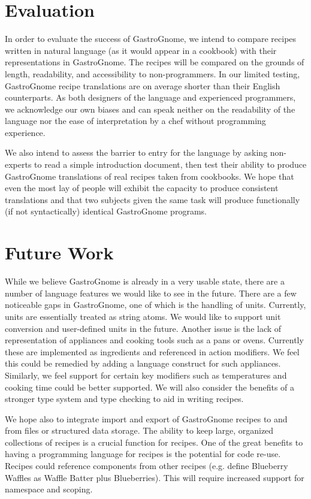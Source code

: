 \documentclass[pldi]{sigplanconf-pldi15}
\begin{document}
\section{Evaluation}
In order to evaluate the success of GastroGnome, we intend to compare recipes
written in natural language (as it would appear in a cookbook) with their
representations in GastroGnome. The recipes will be compared on the grounds of
length, readability, and accessibility to non-programmers. In our limited
testing, GastroGnome recipe translations are on average shorter than their
English counterparts. As both designers of the language and experienced
programmers, we acknowledge our own biases and can speak neither on the
readability of the language nor the ease of interpretation by a chef without
programming experience.

We also intend to assess the barrier to entry for the language by asking
non-experts to read a simple introduction document, then test their ability to
produce GastroGnome translations of real recipes taken from cookbooks. We hope
that even the most lay of people will exhibit the capacity to produce
consistent translations and that two subjects given the same task will produce
functionally (if not syntactically) identical GastroGnome programs.

\section{Future Work}
While we believe GastroGnome is already in a very usable state, there are a
number of language features we would like to see in the future. There are a
few noticeable gaps in GastroGnome, one of which is the handling of units.
Currently, units are essentially treated as string atoms. We would like to
support unit conversion and user-defined units in the future. Another issue is
the lack of representation of appliances and cooking tools such as a pans or
ovens. Currently these are implemented as ingredients and referenced in action
modifiers. We feel this could be remedied by adding a language construct for
such appliances. Similarly, we feel support for certain key modifiers such as
temperatures and cooking time could be better supported. We will also consider
the benefits of a stronger type system and type checking to aid in writing
recipes.

We hope also to integrate import and export of GastroGnome recipes to and from
files or structured data storage. The ability to keep large, organized
collections of recipes is a crucial function for recipes. One of the great
benefits to having a programming language for recipes is the potential for
code re-use. Recipes could reference components from other recipes (e.g.
define Blueberry Waffles as Waffle Batter plus Blueberries). This will require
increased support for namespace and scoping.
\end{document}
